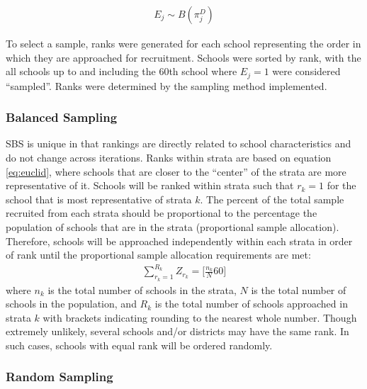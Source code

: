 \documentclass[man,floatsintext]{apa6}
\begin{document}
\begin{align} \label{eq:Ej}
  E_j \sim B(\pi^D_j)
\end{align}

To select a sample, ranks were generated for each school representing the order in which they are approached for recruitment. Schools were sorted by rank, with the all schools up to and including the 60th school where \(E_j = 1\) were considered \enquote{sampled}. Ranks were determined by the sampling method implemented.

\hypertarget{balanced-sampling}{%
\subsubsection{Balanced Sampling}\label{balanced-sampling}}

SBS is unique in that rankings are directly related to school characteristics and do not change across iterations. Ranks within strata are based on equation \eqref{eq:euclid}, where schools that are closer to the \enquote{center} of the strata are more representative of it. Schools will be ranked within strata such that \(r_k= 1\) for the school that is most representative of strata \(k\). The percent of the total sample recruited from each strata should be proportional to the percentage the population of schools that are in the strata (proportional sample allocation). Therefore, schools will be approached independently within each strata in order of rank until the proportional sample allocation requirements are met:
\begin{align} \label{eq:rankCASS}
  \sum_{r_{k}=1}^{R_k}{Z_{r_k} = [\frac{n_k}{N}60}]
\end{align}
where \(n_k\) is the total number of schools in the strata, \(N\) is the total number of schools in the population, and \(R_k\) is the total number of schools approached in strata \(k\) with brackets indicating rounding to the nearest whole number. Though extremely unlikely, several schools and/or districts may have the same rank. In such cases, schools with equal rank will be ordered randomly.

\hypertarget{random-sampling}{%
\subsubsection{Random Sampling}\label{random-sampling}}
\end{document}
